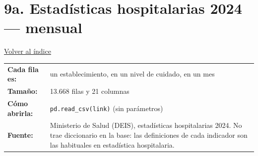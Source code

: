 \documentclass[10.5pt]{article}
\begin{document}
\section*{9a. Estadísticas hospitalarias 2024 --- mensual}
\vspace{-6pt}\hfill{\small\hyperlink{indice}{\textcolor{azuloscuro}{\underline{Volver al índice}}}}\par\vspace{2pt}
\begin{tabularx}{\linewidth}{@{}l X@{}}\textbf{Cada fila es:} & un establecimiento, en un nivel de cuidado, en un mes \\\textbf{Tamaño:} & 13.668 filas y 21 columnas \\\textbf{Cómo abrirla:} & \texttt{pd.read\_\allowbreak{}csv(link)} (sin parámetros) \\\textbf{Fuente:} & Ministerio de Salud (DEIS), estadísticas hospitalarias 2024. No trae diccionario en la base: las definiciones de cada indicador son las habituales en estadística hospitalaria. \\\end{tabularx}
\vspace{6pt}
\end{document}
